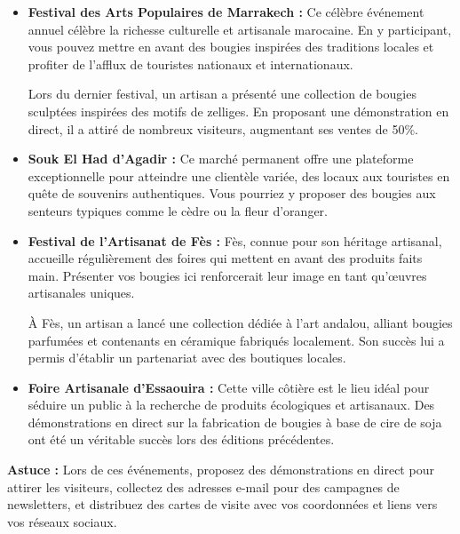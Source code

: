 \documentclass[11pt,fleqn,onecolumn,oneside]{book}
\begin{document}
\begin{itemize}
    \item \textbf{Festival des Arts Populaires de Marrakech :} Ce célèbre événement annuel célèbre la richesse culturelle et artisanale marocaine. En y participant, vous pouvez mettre en avant des bougies inspirées des traditions locales et profiter de l’afflux de touristes nationaux et internationaux.
    
    \begin{example}
    Lors du dernier festival, un artisan a présenté une collection de bougies sculptées inspirées des motifs de zelliges. En proposant une démonstration en direct, il a attiré de nombreux visiteurs, augmentant ses ventes de 50\%.
    \end{example}
    
    \item \textbf{Souk El Had d’Agadir :} Ce marché permanent offre une plateforme exceptionnelle pour atteindre une clientèle variée, des locaux aux touristes en quête de souvenirs authentiques. Vous pourriez y proposer des bougies aux senteurs typiques comme le cèdre ou la fleur d’oranger.
    
    \item \textbf{Festival de l’Artisanat de Fès :} Fès, connue pour son héritage artisanal, accueille régulièrement des foires qui mettent en avant des produits faits main. Présenter vos bougies ici renforcerait leur image en tant qu’œuvres artisanales uniques.
    
    \begin{example}
    À Fès, un artisan a lancé une collection dédiée à l’art andalou, alliant bougies parfumées et contenants en céramique fabriqués localement. Son succès lui a permis d’établir un partenariat avec des boutiques locales.
    \end{example}
    
    \item \textbf{Foire Artisanale d’Essaouira :} Cette ville côtière est le lieu idéal pour séduire un public à la recherche de produits écologiques et artisanaux. Des démonstrations en direct sur la fabrication de bougies à base de cire de soja ont été un véritable succès lors des éditions précédentes.
\end{itemize}

\begin{remark}
\textbf{Astuce :} Lors de ces événements, proposez des démonstrations en direct pour attirer les visiteurs, collectez des adresses e-mail pour des campagnes de newsletters, et distribuez des cartes de visite avec vos coordonnées et liens vers vos réseaux sociaux.
\end{remark}
\end{document}
